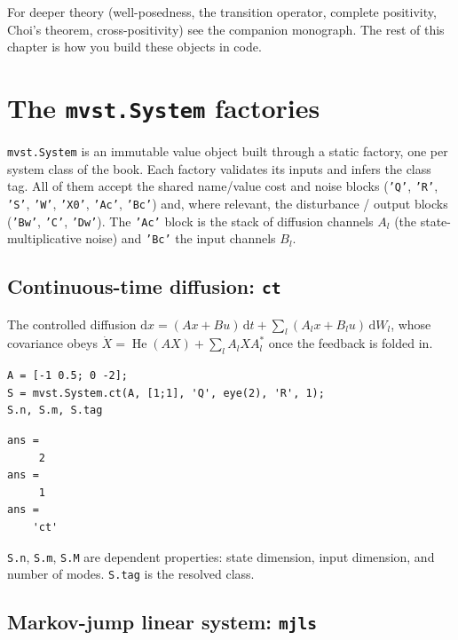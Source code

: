 \documentclass[11pt,oneside]{report}
\newcommand{\code}[1]{\texttt{#1}}
\begin{document}
For deeper theory (well-posedness, the transition operator, complete positivity,
Choi's theorem, cross-positivity) see the companion monograph. The rest of this
chapter is how you build these objects in code.

\hypertarget{the-mvst.system-factories}{%
\section{\texorpdfstring{The \code{mvst.System} factories}{The mvst.System factories}}\label{the-mvst.system-factories}}

\code{mvst.System} is an immutable value object built through a static factory, one
per system class of the book. Each factory validates its inputs and infers the
class tag. All of them accept the shared name/value cost and noise blocks
(\code{'Q'}, \code{'R'}, \code{'S'}, \code{'W'}, \code{'X0'}, \code{'Ac'}, \code{'Bc'}) and, where relevant, the
disturbance / output blocks (\code{'Bw'}, \code{'C'}, \code{'Dw'}). The \code{'Ac'} block is the
stack of diffusion channels \(A_l\) (the state-multiplicative noise) and \code{'Bc'}
the input channels \(B_l\).

\hypertarget{continuous-time-diffusion-ct}{%
\subsection{\texorpdfstring{Continuous-time diffusion: \code{ct}}{Continuous-time diffusion: ct}}\label{continuous-time-diffusion-ct}}

The controlled diffusion
\(\mathrm{d}x=(A x+B u)\,\mathrm{d}t+\sum_l (A_l x+B_l u)\,\mathrm{d}W_l\), whose
covariance obeys \(\dot X=\operatorname{He}(AX)+\sum_l A_l X A_l^{*}\) once the
feedback is folded in.

\begin{lstlisting}[style=matlabstyle]
A = [-1 0.5; 0 -2];
S = mvst.System.ct(A, [1;1], 'Q', eye(2), 'R', 1);
S.n, S.m, S.tag
\end{lstlisting}

\begin{lstlisting}[style=outputstyle]
ans =
     2
ans =
     1
ans =
    'ct'
\end{lstlisting}

\code{S.n}, \code{S.m}, \code{S.M} are dependent properties: state dimension, input dimension,
and number of modes. \code{S.tag} is the resolved class.

\hypertarget{markov-jump-linear-system-mjls}{%
\subsection{\texorpdfstring{Markov-jump linear system: \code{mjls}}{Markov-jump linear system: mjls}}\label{markov-jump-linear-system-mjls}}
\end{document}
